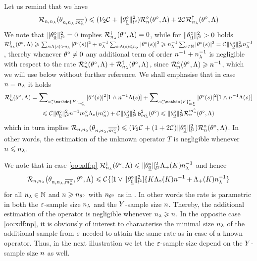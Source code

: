 Let us remind that we have
\begin{equation*}
\mathcal{R}_{n, n_{\lambda}}(\theta_{n, n_{\lambda}, \overline{m_{n}^{\circ}}}) \leq (V_{2} \cst{} + \Vert \theta^{\circ}_{\underline{0}} \Vert_{l^{2}}^{2})\mathcal{R}_{n}^{\circ}(\theta^{\circ}, \Lambda) + 2 \cst{} \mathcal{R}_{n_{\lambda}}^{\dagger}(\theta^{\circ}, \Lambda)
\end{equation*}
We note that $\Vnormlp{\xdf_{\underline{0}}}^2=0$ implies
  $\mRa{\xdf,\Lambda}=0$, while for $\Vnormlp{\xdf_{\underline{0}}}^2>0$ holds
  $\mRa{\xdf,\Lambda}\geq \sum_{s:\iSv[s]>\ssE} \vert \fxdf[(s)] \vert ^2+\ssE^{-1}\sum_{s:\iSv[s]\leq\ssE} \vert \fxdf[(s)] \vert ^2  \geq\ssE^{-1}\sum_{s\in\Nz} \vert \fxdf[(s)] \vert ^2=\cst{}\Vnormlp{\xdf_{\underline{0}}}^2
  \ssE^{-1}$, thereby whenever $\xdf\ne 0$
  any additional term of order $\ssY^{-1}+\ssE^{-1}$
  is negligible with respect to the rate
  $\oRa{\xdf,\Lambda}+\mRa{\xdf,\Lambda}$, since
  $\oRa{\xdf,\Lambda}\geq \ssY^{-1}$, 
  which we will use below without further reference. We shall
  emphasise that in case $\ssY=\ssE$ it holds
  \begin{multline}\label{ge:oo:e7}
    \mRa[\ssY]{\xdf,\Lambda}=\sum\nolimits_{s\in \mathds{F}_{m_{n}^{\circ}}} \vert \fxdf[(s)] \vert^2 [1 \wedge \ssY^{-1}\iSv[s]]
    + \sum\nolimits_{s\in \mathds{F}_{m_{n}^{\circ}}^{c}} \vert \fxdf[(s)] \vert ^2[1\wedge\ssY^{-1}\iSv[s]]\\
    \leq \cst{}\Vnormlp{\xdf_{\underline{0}}}^2 \ssY^{-1} \oDi{\ssY}
    \oiSv[\oDi{\ssY}] +
    \cst{}\Vnormlp{\xdf_{\underline{0}}}^2\bias[\oDi{\ssY}]^2(\theta^{\circ})\leq
    \Vnormlp{\xdf_{\underline{0}}}^2\dRa{\oDi{\ssY}}{\xdf,\Lambda}
  \end{multline}
  which in turn implies $\mathcal{R}_{n, n_{\lambda}}(\theta_{n, n_{\lambda}, \overline{m_{n}^{\circ}}}) \leq (V_{2} \cst{} + (1 + 2 \cst{})\Vert \theta^{\circ}_{\underline{0}} \Vert_{l^{2}}^{2})\mathcal{R}_{n}^{\circ}(\theta^{\circ}, \Lambda)$.
  In other words, the estimation of the unknown operator $T$ is negligible whenever $\ssY\leq\ssE$.

\begin{rmk}
We note that in case \ref{oo:xdf:p}
$\mRa{\xdf,\Lambda}\leq
\Vnormlp{\xdf_{\underline{0}}}^2\miSv[K]\ssE^{-1}$
and hence
\begin{equation}\label{oo:au:p}
 \nmRi{\hxdfPr[\oDi{\ssY}]}{\xdf,\Lambda}
 \leq
\cst{}\{[1\vee\Vnormlp{\xdf_{\underline{0}}}^2]\{
K\oiSv[K]\ssY^{-1}+\miSv[K]\ssE^{-1}\}
\end{equation}
for all $\ssE\in\Nz$ and $\ssY\geq\ssY_{\xdf}$ with $\ssY_{\xdf}$ as in . In other words the
rate is parametric in both the $\rE$-sample size $\ssE$ and the $\rY$-sample size $\ssY$. Thereby, the  additional estimation of the operator is negligible whenever $\ssE\geq\ssY$.
In the opposite case \ref{oo:xdf:np}, it is obviously of interest to characterise the minimal size $\ssE$ of the additional sample from $\rE$ needed to attain the same rate as in case of a known operator.
Thus, in the next illustration we let the $\rE$-sample size depend on the $\rY$-sample size $\ssY$ as well. 
\remEnd
\end{rmk}


